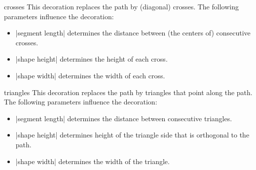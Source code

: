 \begin{decoration}{crosses}
  This decoration replaces the path by (diagonal) crosses. The
  following parameters influence the decoration:
  \begin{itemize}
  \item |segment length|
    determines the distance between (the centers of) consecutive crosses.
  \item |shape height|
    determines the height of each cross.
  \item |shape width|
    determines the width of each cross.
  \end{itemize}
\begin{codeexample}[]
\end{codeexample}
\end{decoration}

\begin{decoration}{triangles}
  This decoration replaces the path by triangles that point along the
  path. The following parameters influence the decoration:
  \begin{itemize}
  \item |segment length|
    determines the distance between consecutive triangles.
  \item |shape height|
    determines height of the triangle side that is orthogonal
    to the path.
  \item |shape width|
    determines the width of the triangle.
  \end{itemize}
\begin{codeexample}[]
\end{codeexample}
\end{decoration}


